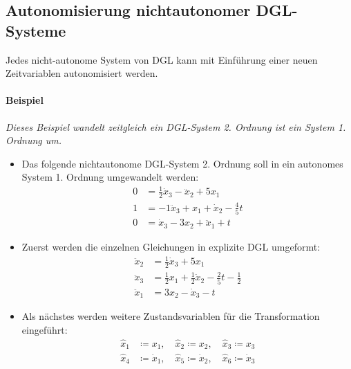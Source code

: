         \subsection{Autonomisierung nichtautonomer DGL-Systeme} %
            Jedes nicht-autonome System von DGL kann mit Einführung einer neuen Zeitvariablen autonomisiert werden.
            
            \paragraph{Beispiel}
                \textit{Dieses Beispiel wandelt zeitgleich ein DGL-System 2. Ordnung ist ein System 1. Ordnung um.}
                
                \begin{itemize}
                	\item Das folgende nichtautonome DGL-System 2. Ordnung soll in ein autonomes System 1. Ordnung umgewandelt werden:
	                	\begin{align*}
		                	0 &= \frac{1}{2} \dot{x} _ 3 - \ddot{x} _ 2 + 5 x _ 1 \\
		                	1 &= -1 \ddot{x} _ 3 + x _ 1 + \dot{x} _ 2 - \frac{4}{5} t \\
		                	0 &= \dot{x} _ 3 - 3 x _ 2 + \ddot{x} _ 1 + t
	                	\end{align*}
	                \item Zuerst werden die einzelnen Gleichungen in explizite DGL umgeformt:
		                \begin{align*}
			                \ddot{x} _ 2 &= \frac{1}{2} \dot{x} _ 3 + 5 x _ 1 \\
			                \ddot{x} _ 3 &= \frac{1}{2} x _ 1 + \frac{1}{2} \dot{x} _ 2 - \frac{2}{5} t - \frac{1}{2} \\
			                \ddot{x} _ 1 &= 3 x _ 2 - \dot{x} _ 3 - t
		                \end{align*}
		            \item Als nächstes werden weitere Zustandsvariablen für die Transformation eingeführt:
			            \begin{align*}
				            \hat{x} _ 1 &\coloneqq x _ 1, \quad \hat{x} _ 2 \coloneqq x _ 2, \quad \hat{x} _ 3 \coloneqq x _ 3 \\
				            \hat{x} _ 4 &\coloneqq \dot{x} _ 1, \quad \hat{x} _ 5 \coloneqq \dot{x} _ 2, \quad \hat{x} _ 6 \coloneqq \dot{x} _ 3 \\

\end{align*}
\end{itemize}
